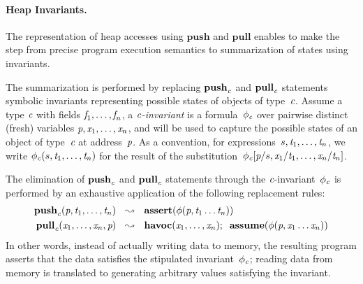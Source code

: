 \paragraph{Heap Invariants.}
The representation of heap accesses using $\textbf{push}$ and
$\textbf{pull}$ enables \jayhorn to make the step from precise
program execution semantics to summarization of states using
invariants. 

The summarization is performed by replacing 
$\textbf{push}_\textit{c}$ and $\textbf{pull}_\textit{c}$ statements symbolic
invariants representing possible states of objects of
type~$\textit{c}$. Assume a type $\textit{c}$ with fields $\textit{f}_1, \ldots,
\textit{f}_n$, a \emph{$\textit{c}$-invariant} is a formula~$\phi_\textit{c}$ over
pairwise distinct (fresh) variables $\textit{p}, \textit{x}_1, \ldots, \textit{x}_n$,
and will be used to capture the possible states of an object of
type~$\textit{c}$ at address~$\textit{p}$. As a convention, for expressions~$s,
\textit{t}_1, \ldots, \textit{t}_n$, we write $\phi_\textit{c}(s, \textit{t}_1, \ldots,
\textit{t}_n)$ for the result of the substitution~$\phi_\textit{c}[\textit{p}/s,
\textit{x}_1/\textit{t}_1, \ldots, \textit{x}_n/\textit{t}_n]$.

The elimination of $\textbf{push}_\textit{c}$ and $\textbf{pull}_\textit{c}$ 
statements through
the $\textit{c}$-invariant~$\phi_\textit{c}$ is performed by an exhaustive
application of the following replacement rules:
\begin{align}
  \label{eq:pushRepl}
  \textbf{push}_\textit{c}(\textit{p}, \textit{t}_1,\ldots,\textit{t}_n) &~~\leadsto~~
  \textbf{assert}(\phi(\textit{p}, \textit{t}_1 \ldots \textit{t}_n))
  \\
  \label{eq:pullRepl}
  \textbf{pull}_\textit{c}(\textit{x}_1,\ldots,\textit{x}_n, \textit{p}) &~~\leadsto~~
  \textbf{havoc}(\textit{x}_1,\ldots,\textit{x}_n);\;\;
  \textbf{assume}(\phi(\textit{p}, \textit{x}_1 \ldots \textit{x}_n))
\end{align}
In other words, instead of actually writing data to memory, the
resulting program asserts that the data satisfies the stipulated
invariant~$\phi_\textit{c}$; reading data from memory is translated to
generating arbitrary values satisfying the invariant. 


